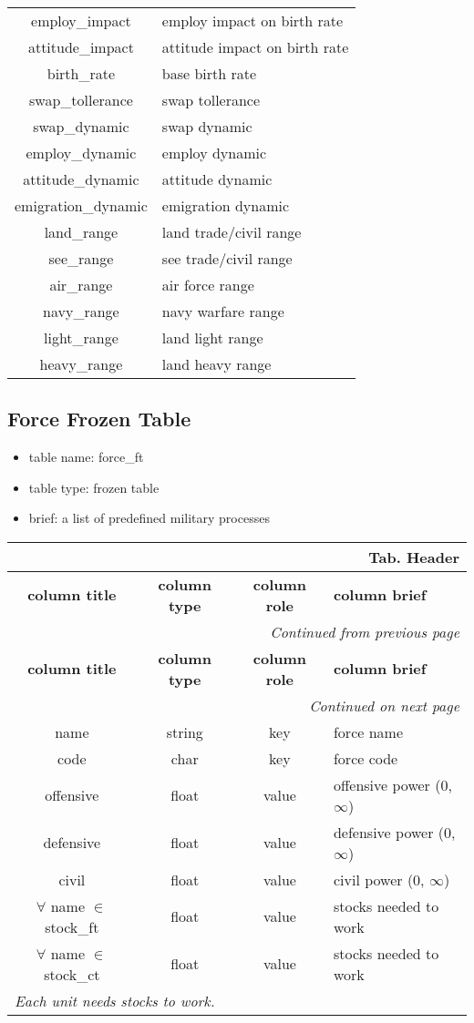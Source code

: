\documentclass[a4paper,oneside,titlepage]{report}
\newcommand*{\LTHeaderIV}[5]{
  \multicolumn{4}{r}{\textbf{Tab. \thesubsection} \textbf{#1}}\\    
  \hline
  \textbf{#2} & \textbf{#3} & \textbf{#4} & \textbf{#5}\\
  \hline
  
  \endfirsthead
  \multicolumn{4}{r}{\textit{Continued from previous page}}\\    
  \hline
  \textbf{#2} & \textbf{#3} & \textbf{#4} & \textbf{#5}\\
  \hline
  \endhead
  \hline
  \multicolumn{4}{r}{\textit{Continued on next page}}\\
  \endfoot
  \hline
  \endlastfoot  
}
\begin{document}
\begin{longtable}{ |c|l| }
    employ\_impact & employ impact on birth rate\\ 
    attitude\_impact & attitude impact on birth rate\\ 
    birth\_rate & base birth rate\\ 
    \hline
    swap\_tollerance & swap tollerance\\ 
    swap\_dynamic & swap dynamic\\ 
    \hline
    employ\_dynamic & employ dynamic\\ 
    attitude\_dynamic & attitude dynamic\\ 
    emigration\_dynamic & emigration dynamic\\ 
    \hline
    land\_range & land trade$/$civil range\\      
    see\_range & see trade$/$civil range\\
    \hline
    air\_range & air force range\\
    navy\_range & navy warfare range\\
    light\_range & land light range\\
    heavy\_range & land heavy range\\
  \end{longtable}
 
\subsection{Force Frozen Table}
\begin{itemize}
  \setlength{\itemsep}{0pt}
  \setlength{\parskip}{0pt}
\item table name: force\_ft  
\item table type: frozen table   
\item brief: a list of predefined military processes
\end{itemize}
\label{force_ft}

\vspace{-0.5cm}
\begin{longtable}{ |c|c|c|l| } 
  \LTHeaderIV{Header}{column title}{column type}{column role}{column brief}
  name & string & key & force name\\
  code & char & key & force code\\
  offensive & float & value & offensive power (0, $\infty$)\\
  defensive & float & value & defensive power (0, $\infty$)\\
  civil & float & value & civil power (0, $\infty$)\\
  $\forall$ name $\in$ stock\_ft & float & value & stocks needed to work\\
  $\forall$ name $\in$ stock\_ct & float & value & stocks needed to work\\
  \multicolumn{4}{|l|}{\textit{Each unit needs stocks to work.}}\\  
\end{longtable}        
\end{document}
